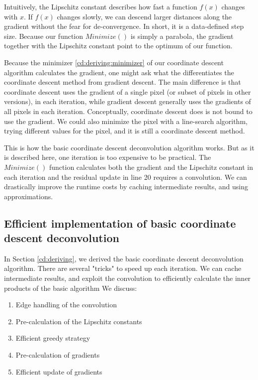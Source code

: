 Intuitively, the Lipschitz constant describes how fast a function $f(x)$ changes with $x$. If $f(x)$ changes slowly, we can descend larger distances along the gradient without the fear for de-convergence. In short, it is a data-defined step size. Because our function $Minimize()$ is simply a parabola, the gradient together with the Lipschitz constant point to the optimum of our function.

Because the minimizer \eqref{cd:deriving:minimizer} of our coordinate descent algorithm calculates the gradient, one might ask what the differentiates the coordinate descent method from gradient descent. The main difference is that coordinate descent uses the gradient of a single pixel (or subset of pixels in other versions), in each iteration, while gradient descent generally uses the gradients of all pixels in each iteration. Conceptually, coordinate descent does is not bound to use the gradient. We could also minimize the pixel with a line-search algorithm, trying different values for the pixel, and it is still a coordinate descent method.

This is how the basic coordinate descent deconvolution algorithm works. But as it is described here, one iteration is too expensive to be practical. The $Minimize()$ function calculates both the gradient and the Lipschitz constant in each iteration and the residual update in line 20 requires a convolution. We can drastically improve the runtime costs by caching intermediate results, and using approximations.

\subsection{Efficient implementation of basic coordinate descent deconvolution}\label{cd:efficient}
In Section \ref{cd:deriving}, we derived the basic coordinate descent deconvolution algorithm. There are several "tricks" to speed up each iteration. We can cache intermediate results, and exploit the convolution to efficiently calculate the inner products of the basic algorithm We discuss:

\begin{enumerate}
	\item Edge handling of the convolution
	\item Pre-calculation of the Lipschitz constants
	\item Efficient greedy strategy
 	\item Pre-calculation of gradients
	\item Efficient update of gradients
\end{enumerate}

